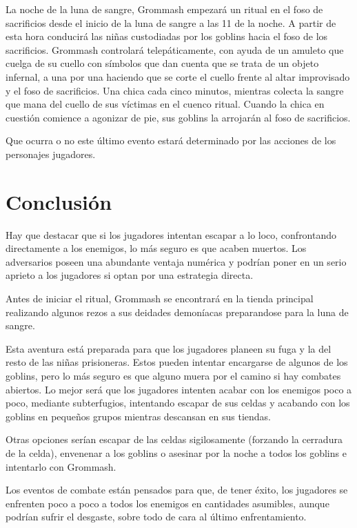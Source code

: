 \documentclass[10pt,twoside,twocolumn,openany]{dndbook}
\begin{document}
La noche de la luna de sangre, Grommash empezará un ritual en el foso de sacrificios desde el inicio de la 
luna de sangre a las 11 de la noche. A partir de esta hora conducirá las niñas custodiadas por los 
goblins hacia el foso de los sacrificios. Grommash controlará telepáticamente, con ayuda de un 
amuleto que cuelga de su cuello con símbolos que dan cuenta que se trata de un objeto infernal, 
a una por una haciendo que se corte el cuello frente al altar improvisado y el foso de sacrificios. 
Una chica cada cinco minutos, mientras colecta la sangre que mana del cuello de sus víctimas en el 
cuenco ritual. Cuando la chica en cuestión comience a agonizar de pie, sus goblins la arrojarán al 
foso de sacrificios.

Que ocurra o no este último evento estará determinado por las acciones de los personajes jugadores.

\section{Conclusión}

Hay que destacar que si los jugadores intentan escapar a lo loco, confrontando directamente a los 
enemigos, lo más seguro es que acaben muertos. Los adversarios poseen una abundante ventaja numérica y 
podrían poner en un serio aprieto a los jugadores si optan por una estrategia directa.

Antes de iniciar el ritual, Grommash se encontrará en la tienda principal realizando algunos
rezos a sus deidades demoníacas preparandose para la luna de sangre.

Esta aventura está preparada para que los jugadores planeen su fuga y la del resto de las niñas prisioneras. 
Estos pueden intentar encargarse de algunos de los goblins, pero lo más seguro es que alguno muera por 
el camino si hay combates abiertos. Lo mejor será que los jugadores intenten acabar con los enemigos 
poco a poco, mediante subterfugios, intentando escapar de sus celdas y acabando con los goblins en 
pequeños grupos mientras descansan en sus tiendas.

Otras opciones serían escapar de las celdas sigilosamente (forzando la cerradura de la celda), envenenar 
a los goblins o asesinar por la noche a todos los goblins e intentarlo con Grommash. 

Los eventos de combate están pensados para que, de tener éxito, los jugadores se enfrenten poco a poco 
a todos los enemigos en cantidades asumibles, aunque podrían sufrir el desgaste, sobre todo de cara al 
último enfrentamiento.
\end{document}
